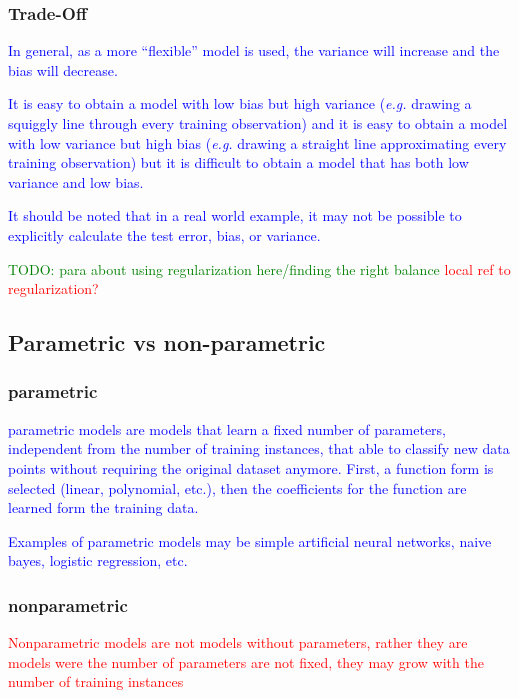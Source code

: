 \subsubsection{Trade-Off}


\textcolor{blue}{In general, as a more ``flexible'' model is used, the variance will increase and the bias will decrease.}


\textcolor{blue}{It is easy to obtain a model with low bias but high variance (\emph{e.g.} drawing a squiggly line through every training observation) and it is easy to obtain a model with low variance but high bias (\emph{e.g.} drawing a straight line approximating every training observation) but it is difficult to obtain a model that has both low variance and low bias.}

\textcolor{blue}{It should be noted that in a real world example, it may not be possible to explicitly calculate the test error, bias, or variance.}

\textcolor{green}{TODO: para about using regularization here/finding the right balance \textcolor{red}{local ref to regularization?}}

\subsection{Parametric vs non-parametric}

\subsubsection{parametric}

\textcolor{blue}{parametric models are models that learn a fixed number of parameters, independent from the number of training instances, that able to classify new data points without requiring the original dataset anymore. First, a function form is selected (linear, polynomial, etc.), then the coefficients for the function are learned form the training data.}
	
\textcolor{blue}{Examples of parametric models may be simple artificial neural networks, naive bayes, logistic regression, etc.}

\subsubsection{nonparametric}

\textcolor{red}{Nonparametric models are not models without parameters, rather they are models were the number of parameters are not fixed, they may grow with the number of training instances}

